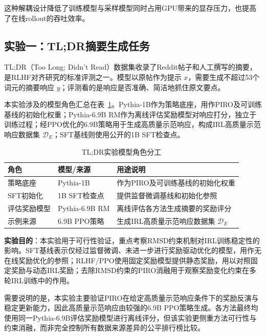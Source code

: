 这种解耦设计降低了训练模型与采样模型同时占用GPU带来的显存压力，也提高了在线rollout的吞吐效率。

\subsection{实验一：TL;DR摘要生成任务}

TL;DR（Too Long; Didn't Read）数据集\cite{ouyang2022training}收录了Reddit帖子和人工撰写的摘要，是RLHF对齐研究的标准评测之一。模型以原帖作为提示 $x$，需要生成不超过53个词元的摘要响应 $y$；评测看的是响应是否准确、简洁地抓住原文要点。

本实验涉及的模型角色汇总在表~\ref{tab:model_roles}。Pythia-1B作为策略底座，用作PIRO及可训练基线的初始化权重；Pythia-6.9B RM作为离线评估奖励模型对响应打分，独立于训练过程；经PPO优化的6.9B策略用于生成高质量示范响应，构成IRL高质量示范响应数据集 $\mathcal{D}_E$；SFT基线则使用公开的1B SFT检查点。

\begin{table}[htbp]
    \centering
    \caption{TL;DR实验模型角色分工}
    \label{tab:model_roles}
    \small
    \renewcommand{\arraystretch}{1.2}
    \begin{tabular}{p{}p{}p{}}
        \toprule
        \textbf{角色} & \textbf{模型/来源} & \textbf{用途说明} \\
        \midrule
        策略底座 & Pythia-1B & 作为PIRO及可训练基线的初始化权重 \\
        SFT初始化 & 1B SFT检查点 & 提供监督微调基线和初始化参照 \\
        评估奖励模型 & Pythia-6.9B RM & 离线评估各方法生成摘要的奖励评分 \\
        示例来源 & 6.9B PPO策略 & 生成IRL高质量示范响应数据集 $\mathcal{D}_E$ \\
        \bottomrule
    \end{tabular}
\end{table}

\textbf{实验目的}：本实验用于可行性验证，重点考察RMSD约束机制对IRL训练稳定性的影响。SFT基线表示仅经过监督微调、未进一步进行奖励驱动优化的模型，用作无在线奖励优化的参照；RLHF/PPO\cite{ouyang2022training}使用固定奖励模型提供静态奖励，用以对照固定奖励与动态IRL奖励；去除RMSD约束的PIRO消融用于观察奖励变化约束在多轮IRL训练中的作用。

需要说明的是，本实验主要验证PIRO在给定高质量示范响应条件下的奖励反演与稳定更新能力，因此高质量示范响应由较强的6.9B PPO策略生成。各方法最终均使用同一Pythia-6.9B评估奖励模型进行离线评分，但该实验更侧重方法可行性与约束消融，而非完全控制所有数据来源差异的公平排行榜比较。

